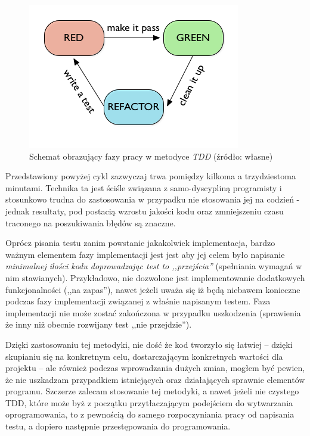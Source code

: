 \documentclass[pdflatex,11pt]{aghdpl}
\begin{document}
\begin{figure}[ch]
 \begin{center}
  \includegraphics[scale=0.8]{tdd_cycle}
 \end{center}
 \label{tdd_cycle}
 \caption{Schemat obrazujący fazy pracy w metodyce \textit{TDD} \small{(źródło: własne)}}
\end{figure}


Przedstawiony powyżej cykl zazwyczaj trwa pomiędzy kilkoma a trzydziestoma minutami. Technika ta jest ściśle związana z samo-dyscypliną programisty
i stosunkowo trudna do zastosowania w przypadku nie stosowania jej na codzień - jednak resultaty, pod postacią wzrostu jakości kodu oraz zmniejszeniu 
czasu traconego na poszukiwania błędów są znaczne.

Oprócz pisania testu zanim powstanie jakakolwiek implementacja, bardzo ważnym elementem fazy implementacji jest jest aby jej celem 
było napisanie \textit{minimalnej ilości kodu doprowadzając test to ,,przejścia''} (spełniania wymagań w nim stawianych). Przykładowo, nie dozwolone jest
implementowanie dodatkowych funkcjonalności (,,na zapas''), nawet jeżeli uważa się iż będą niebawem konieczne podczas fazy implementacji związanej 
z właśnie napisanym testem. Faza implementacji nie może zostać zakończona w przypadku uszkodzenia (sprawienia że inny niż obecnie rozwijany test ,,nie przejdzie'').

Dzięki zastosowaniu tej metodyki, nie dość że kod tworzyło się łatwiej -- dzięki skupianiu się na konkretnym celu, dostarczającym konkretnych wartości dla projektu -- 
ale również podczas wprowadzania dużych zmian, mogłem być pewien, że nie uszkadzam przypadkiem istniejących oraz działających sprawnie elementów programu.
Szczerze zalecam stosowanie tej metodyki, a nawet jeżeli nie czystego TDD, które może byż z początku przytłaczającym podejściem do wytwarzania oprogramowania,
to z pewnością do samego rozpoczyniania pracy od napisania testu, a dopiero następnie przestępowania do programowania.
\end{document}
